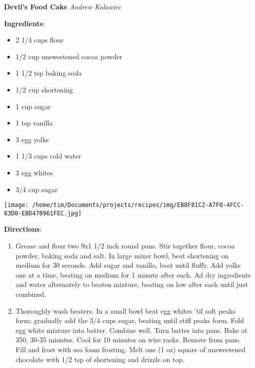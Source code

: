 \documentclass[11pt, twoside, openany]{book}
\begin{document}
\noindent\begin{minipage}[t]{\linewidth}%
{\Large\textbf{Devil's Food Cake}} \label{devil's-food-cake}\hfill\textit{Andrew Kulawiec}\\
\noindent\begin{minipage}[t]{0.78\linewidth}%
\textbf{Ingredients}:\vspace{-3mm}
\begin{multicols}{2}
\begin{itemize}\setlength\itemsep{-1mm}
\item 2 1/4 cups flour
\item 1/2 cup unsweetened cocoa powder
\item 1 1/2 tsp baking soda
\item 1/2 cup shortening
\item 1 cup sugar
\item 1 tsp vanilla
\item 3 egg yolks
\item 1 1/3 cups cold water
\item 3 egg whites
\item 3/4 cup sugar
\end{itemize}
\end{multicols}
\end{minipage}
\noindent\begin{minipage}[t]{0.18\linewidth}
\centering \strut\vspace*{-\baselineskip}\newline
\texttt{[image: /home/tim/Documents/projects/recipes/img/EB8F81C2-A7F0-4FCC-83D0-EBD470961FEC.jpg]}\\
\end{minipage}\vspace{3mm}
\textbf{Directions}:
\vspace{-3mm}\begin{enumerate}\setlength\itemsep{-1mm}
\item Grease and flour two 9x1 1/2 inch round pans. Stir together flour, cocoa powder, baking soda and salt. In large mixer bowl, beat shortening on medium for 30 seconds. Add sugar and vanilla, beat until fluffy. Add yolks one at a time, beating on medium for 1 minute after each. Ad dry ingredients and water alternately to beaten mixture, beating on low after each until just combined.
\item Thoroughly wash beaters. In a small bowl beat egg whites 'til soft peaks form; gradually add the 3/4 cups sugar, beating until stiff peaks form. Fold egg white mixture into batter. Combine well. Turn batter into pans. Bake at 350, 30-35 minutes. Cool for 10 minutes on wire racks. Remove from pans. Fill and frost with sea foam frosting. Melt one (1 oz) square of unsweetened chocolate with 1/2 tsp of shortening and drizzle on top.
\end{enumerate}
\end{minipage}\vspace{8mm}
\end{document}
